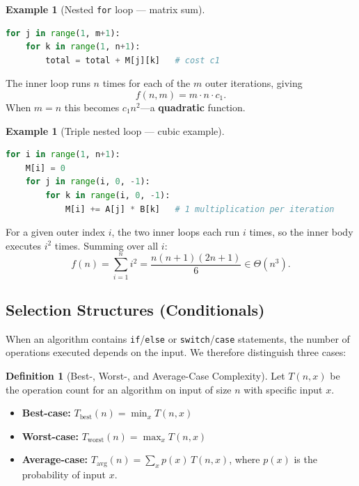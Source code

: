 \documentclass[11pt, a4paper, notitlepage]{report}
\theoremstyle{definition}
\newtheorem{definition}[theorem]{Definition}
\theoremstyle{remark}
\theoremstyle{definition}
\newtheorem{example}[theorem]{Example}
\begin{document}
\begin{example}[Nested \texttt{for} loop --- matrix sum]
\label{ex:nested-loop}
\leavevmode
\begin{lstlisting}[language=Python]
for j in range(1, m+1):
    for k in range(1, n+1):
        total = total + M[j][k]   # cost c1
\end{lstlisting}
The inner loop runs $n$ times for each of the $m$ outer iterations, giving
\[
  f(n, m) = m \cdot n \cdot c_1.
\]
When $m = n$ this becomes $c_1 n^2$---a \textbf{quadratic} function.
\end{example}

\begin{example}[Triple nested loop --- cubic example]
\label{ex:triple-loop}
\leavevmode
\begin{lstlisting}[language=Python]
for i in range(1, n+1):
    M[i] = 0
    for j in range(i, 0, -1):
        for k in range(i, 0, -1):
            M[i] += A[j] * B[k]   # 1 multiplication per iteration
\end{lstlisting}
For a given outer index $i$, the two inner loops each run $i$ times, so the
inner body executes $i^2$ times.  Summing over all $i$:
\[
  f(n) = \sum_{i=1}^{n} i^2 = \frac{n(n+1)(2n+1)}{6} \in \Theta(n^3).
\]
\end{example}

\subsection{Selection Structures (Conditionals)}
\label{subsec:selection}

When an algorithm contains \texttt{if}/\texttt{else} or \texttt{switch}/\texttt{case}
statements, the number of operations executed depends on the input.  We therefore
distinguish three cases:

\begin{definition}[Best-, Worst-, and Average-Case Complexity]
\label{def:bwa-cases}
Let $T(n, x)$ be the operation count for an algorithm on input of size $n$ with
specific input $x$.
\begin{itemize}
  \item \textbf{Best-case:} $T_{\text{best}}(n) = \min_x T(n,x)$
  \item \textbf{Worst-case:} $T_{\text{worst}}(n) = \max_x T(n,x)$
  \item \textbf{Average-case:} $T_{\text{avg}}(n) = \sum_x p(x)\,T(n,x)$, where $p(x)$ is the
        probability of input $x$.
\end{itemize}
\end{definition}
\end{document}
